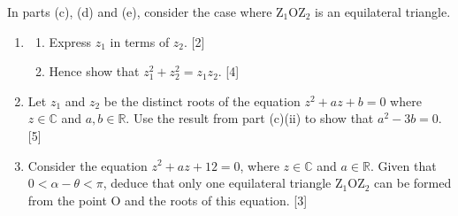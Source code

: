 \documentclass[12pt, twoside]{article}
\begin{document}
\begin{enumerate}[itemsep=0.15cm]
In parts (c), (d) and (e), consider the case where
$\mathrm{Z}_1\mathrm{OZ}_2$ is an equilateral triangle.

\begin{enumerate}[itemsep=0.15cm]
  \item[(c)] \begin{enumerate}[itemsep=0.15cm]
    \item[(i)] Express $z_1$ in terms of $z_2$. \hfill [2]
    \item[(ii)] Hence show that $z_1^2 + z_2^2 = z_1z_2$. \hfill [4]
  \end{enumerate}
  \item[(d)] Let $z_1$ and $z_2$ be the distinct roots of the equation
  $z^2 + az + b = 0$ where $z \in \mathbb{C}$ and
  $a, b \in \mathbb{R}$. Use the result from part (c)(ii) to show that
  $a^2 - 3b = 0$. \hfill [5]
  \item[(e)] Consider the equation $z^2 + az + 12 = 0$, where
  $z \in \mathbb{C}$ and $a \in \mathbb{R}$. Given that
  $0 < \alpha - \theta < \pi$, deduce that only one equilateral triangle
  $\mathrm{Z}_1\mathrm{OZ}_2$ can be formed from the point O and the
  roots of this equation. \hfill [3]
\end{enumerate}

\end{enumerate}
\end{document}
